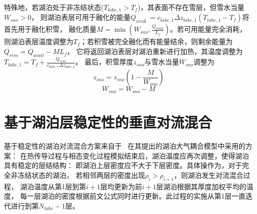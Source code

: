特殊地，若湖泊处于非冻结状态($T_{lake,1}>T_f$)，其表面不存在雪层，但雪水当量$W_{sno}>0$，
则湖泊表层可用于融化的能量$Q_{\text {avail }}=c_{lake, 1} \Delta z_{lake, 1}\left(T_{lake, 1}-T_{f}\right)$将首先用于融化积雪，
融化质量$M=\min{\left(W_{sno},\frac{Q_{avail}}{L_f}\right)}$。若可用能量完全消耗，
则湖泊表层温度调整为$T_f$；若积雪被完全融化而有能量结余，则剩余能量为$Q_{rem}=Q_{avail}-ML_f$，
它将返回湖泊表层对湖泊重新进行加热，其温度调整为$T_{lake, 1}=T_{f}+\frac{Q_{rem}}{c_{lake, 1} \Delta z_{lake, 1}}$。
最后，积雪厚度$z_{sno}$与雪水当量$W_{sno}$调整为
\begin{equation}
z_{sno}=z_{sno}\left(1-\frac{M}{W_{sno}}\right)
\end{equation}
\begin{equation}
W_{sno}=W_{sno}-M
\end{equation}

\section{基于湖泊层稳定性的垂直对流混合}
基于稳定性的湖泊对流混合方案来自于~\citet{hostetler1993interactive,hostetler1994lake} 在其提出的湖泊大气耦合模型中采用的方案：
在热传导过程与相态变化过程模拟结束后，湖泊温度应再次调整，使得湖泊具有稳定的层结结构：
即湖泊上层密度应不大于下层密度。具体操作为，对于完全非冻结状态的湖泊，
若相邻两层的密度出现$\rho_i>\rho_{i+1}$，则湖泊发生对流混合过程，
湖泊温度从第1层到第$i+1$层均更新为前$i+1$层湖泊根据其厚度加权平均的温度，
每一层湖泊的密度根据前文公式同时进行更新。此过程的实施从第1层一直迭代进行到第$N_{lake}-1$层。

